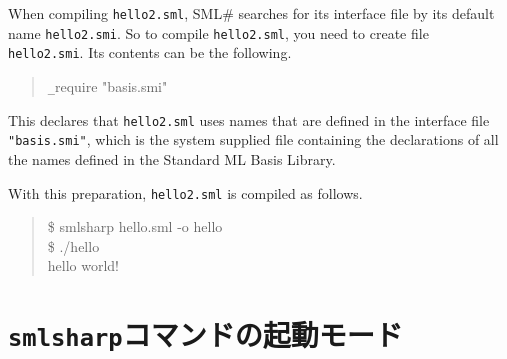 \documentclass{jbook}
\newcommand{\txt}[2]{#1}
\newcommand{\smlsharp}{SML\#}
\newenvironment{program}{\begin{quote}\begin{tt}}%
                        {\end{tt}\end{quote}}
\begin{document}
	When compiling {\tt hello2.sml}, \smlsharp{} searches for 
its interface file by its default name {\tt hello2.smi}.
	So to compile {\tt hello2.sml}, you need to create file {\tt
hello2.smi}.
	Its contents can be the following.
\begin{program}
\verb|_|require "basis.smi"
\end{program}
	This declares that {\tt hello2.sml} uses names that are defined
in the interface file {\tt "basis.smi"}, which is the system supplied
file containing the declarations of all the names defined in the
Standard ML Basis Library.

	With this preparation, {\tt hello2.sml} is compiled as follows.
\begin{program}
\$ smlsharp hello.sml -o hello\\
\$ ./hello\\
hello world!
\end{program}
\fi%

\section{
\txt{{\tt smlsharp}コマンドの起動モード}
    {{\tt smlsharp} command modes}
}
\label{sec:tutorialSmlsharpParameter}
\end{document}
